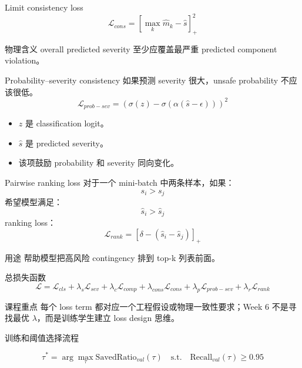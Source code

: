 \documentclass[aspectratio=169,11pt]{beamer}
\newcommand{\sigmoid}{\sigma}
\begin{document}
\begin{frame}{Limit consistency loss}
\[
\mathcal L_{cons}=\left[\max_k\hat m_k-\hat s\right]_+^2
\]
\begin{block}{物理含义}
overall predicted severity 至少应覆盖最严重 predicted component violation。
\end{block}
\end{frame}

\begin{frame}{Probability--severity consistency}
如果预测 severity 很大，unsafe probability 不应该很低。
\[
\mathcal L_{prob-sev}=\left(\sigmoid(z)-\sigmoid(\alpha(\hat s-\epsilon))\right)^2
\]
\begin{itemize}
  \item $z$ 是 classification logit。
  \item $\hat s$ 是 predicted severity。
  \item 该项鼓励 probability 和 severity 同向变化。
\end{itemize}
\end{frame}

\begin{frame}{Pairwise ranking loss}
对于一个 mini-batch 中两条样本，如果：
\[
s_i>s_j
\]
希望模型满足：
\[
\hat s_i>\hat s_j
\]
ranking loss：
\[
\mathcal L_{rank}=\left[\delta-(\hat s_i-\hat s_j)\right]_+
\]
\begin{block}{用途}
帮助模型把高风险 contingency 排到 top-k 列表前面。
\end{block}
\end{frame}

\begin{frame}{总损失函数}
\[
\mathcal{L}=\mathcal{L}_{cls}
+\lambda_s\mathcal{L}_{sev}
+\lambda_c\mathcal{L}_{comp}
+\lambda_{cons}\mathcal{L}_{cons}
+\lambda_p\mathcal{L}_{prob-sev}
+\lambda_r\mathcal{L}_{rank}
\]
\begin{alertblock}{课程重点}
每个 loss term 都对应一个工程假设或物理一致性要求；Week 6 不是寻找最优 $\lambda$，而是训练学生建立 loss design 思维。
\end{alertblock}
\end{frame}

\begin{frame}{训练和阈值选择流程}
\centering
{}
\vspace{0.3cm}
\[
\tau^*=\arg\max_\tau \mathrm{SavedRatio}_{val}(\tau)
\quad \mathrm{s.t.}\quad
\mathrm{Recall}_{val}(\tau)\ge0.95
\]
\end{frame}
\end{document}
